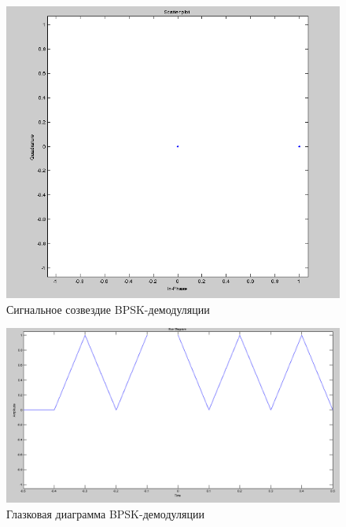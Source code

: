 \begin{figure}[H]
\includegraphics[width=150mm, scale = 0.9]{lab9/9_3}
   \caption{Сигнальное созвездие BPSK-демодуляции}
\end{figure}



\begin{figure}[H]
\includegraphics[width=150mm, scale = 0.9]{lab9/9_4}
   \caption{Глазковая диаграмма BPSK-демодуляции}
\end{figure}




